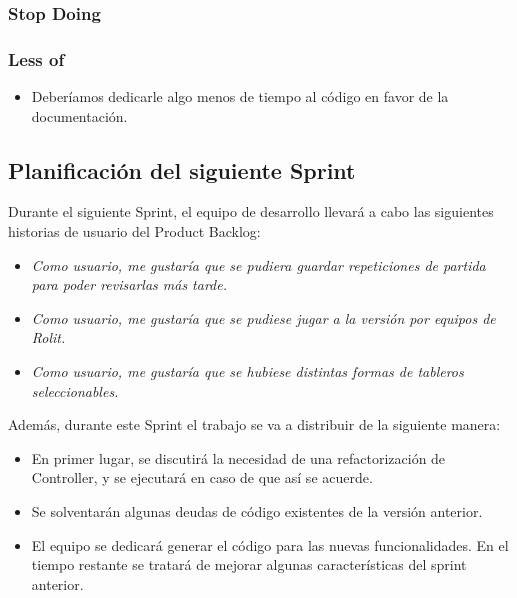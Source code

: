 \documentclass[../../SCRUM.tex]{subfiles}
\begin{document}
\subsubsection*{Stop Doing}


\subsubsection*{Less of}
\begin{itemize}
\item Deberíamos dedicarle algo menos de tiempo al código en favor de la documentación.
\end{itemize}

\subsection{Planificación del siguiente Sprint}
Durante el siguiente Sprint, el equipo de desarrollo llevará a cabo las siguientes historias de usuario del Product Backlog:
\begin{itemize}
\item \textit{Como usuario, me gustaría que se pudiera guardar repeticiones de partida para poder revisarlas más tarde.}
\item \textit{Como usuario, me gustaría que se pudiese jugar a la versión por equipos de Rolit.}
\item \textit{Como usuario, me gustaría que se hubiese distintas formas de tableros seleccionables.}
\end{itemize}
Además, durante este Sprint el trabajo se va a distribuir de la siguiente manera:
\begin{itemize}
\item En primer lugar, se discutirá la necesidad de una refactorización de Controller, y se ejecutará en caso de que así se acuerde.
\item Se solventarán algunas deudas de código existentes de la versión anterior.
\item El equipo se dedicará generar el código para las nuevas funcionalidades. En el tiempo restante se tratará de mejorar algunas características del sprint anterior.
\end{itemize}
\end{document}
